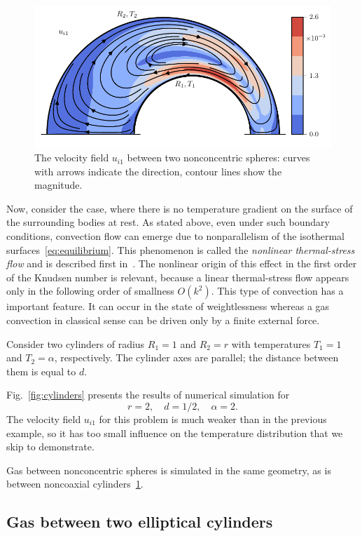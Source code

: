 \documentclass[smallextended, referee]{svjour3} %
\begin{document}
\begin{figure}
	\centering
	\includegraphics{Fig8}
	\caption{The velocity field \(u_{i1}\) between two nonconcentric spheres:
		curves with arrows indicate the direction, contour lines show the magnitude.}
	\label{fig:spheres}
\end{figure}

Now, consider the case, where there is no temperature gradient on the surface of the surrounding bodies at rest.
As stated above, even under such boundary conditions, convection flow can emerge
due to nonparallelism of the isothermal surfaces~\eqref{eq:equilibrium}.
This phenomenon is called the \emph{nonlinear thermal-stress flow}
and is described first in~\cite{Kogan1971}.
The nonlinear origin of this effect in the first order of the Knudsen number is relevant,
because a linear thermal-stress flow appears only in the following order of smallness \(O(k^2)\).
This type of convection has a important feature. It can occur in the state of weightlessness
whereas a gas convection in classical sense can be driven only by a finite external force.

Consider two cylinders of radius \(R_1 = 1\) and \(R_2 = r\)
with temperatures \(T_1 = 1\) and \(T_2 = \alpha\), respectively.
The cylinder axes are parallel; the distance between them is equal to \(d\).

Fig.~\ref{fig:cylinders} presents the results of numerical simulation for
\[ r = 2, \quad d = 1/2, \quad \alpha = 2. \]
The velocity field \(u_{i1}\) for this problem is much weaker than in the previous example,
so it has too small influence on the temperature distribution that we skip to demonstrate.

Gas between nonconcentric spheres is simulated in the same geometry,
as is between noncoaxial cylinders~\ref{fig:spheres}.

\subsection{Gas between two elliptical cylinders}
\end{document}

